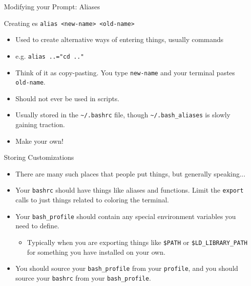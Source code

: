 \begin{frame}[fragile]{Modifying your Prompt: Aliases}
  \begin{block}{Creating es}
    \texttt{alias <new-name> <old-name>}
    \begin{itemize}
      \item Used to create alternative ways of entering things, usually commands
      \item e.g. \texttt{alias ..="cd .."}
      \item Think of it as copy-pasting.  You type \texttt{new-name} and your terminal pastes \texttt{old-name}.
      \item Should not ever be used in scripts.
    \end{itemize}
  \end{block}
  \begin{itemize}[<+- | alert@+>]
    \item Usually stored in the \texttt{\textasciitilde/.bashrc} file, though \texttt{\textasciitilde/.bash\_aliases}
          is slowly gaining traction.
    \item Make your own!
  \end{itemize}
\end{frame}

\begin{frame}[fragile]{Storing Customizations}
  \begin{itemize}[<+- | alert@+>]
    \item There are many such places that people put things, but generally speaking...
    \item Your \texttt{bashrc} should have things like aliases and functions.  Limit the \texttt{export} calls
          to just things related to coloring the terminal.
    \item Your \texttt{bash\_profile} should contain any special environment variables you need to define.
    \begin{itemize}[<+- | alert@+>]
      \item Typically when you are exporting things like \texttt{\$PATH} or \texttt{\$LD\_LIBRARY\_PATH} for
            something you have installed on your own.
    \end{itemize}
    \item You should source your \texttt{bash\_profile} from your \texttt{profile}, and you should source your
          \texttt{bashrc} from your \texttt{bash\_profile}.
  \end{itemize}
\end{frame}

